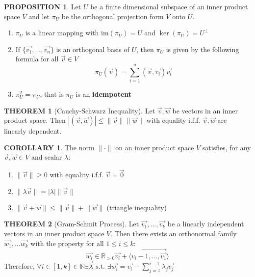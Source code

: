 \documentclass[12pt]{article}
\theoremstyle{definition}
\newtheorem{theorem}{THEOREM}[subsection]
\newcommand{\norm}[1]{\lVert #1 \rVert}
\newcommand{\image}{\text{im}}
\newtheorem{prop}{PROPOSITION}[subsection]
\newtheorem{corollary}{COROLLARY}[subsection]
\begin{document}
\begin{prop}
    Let $U$ be a finite dimensional subspace of an inner product space $V$ and let $\pi_U$ be the orthogonal projection form $V$ onto $U$.
    \begin{enumerate}
        \item $\pi_U$ is a linear mapping with $\image(\pi_U) = U$ and $\ker(\pi_U) = U^\perp$
        \item If $\{\vec{v_1},..., \vec{v_n}\}$ is an orthogonal basis of $U$, then $\pi_U$ is given by the following formula for all $\vec{v} \in V$ $$\pi_U(\vec{v}) = \sum_{i=1}^n(\vec{v},\vec{v_i})\vec{v_i}$$
        \item $\pi_U^2 = \pi_U$, that is $\pi_U$ is an \textbf{idempotent}
    \end{enumerate}
\end{prop}

\begin{theorem}[Cauchy-Schwarz Inequality]
    Let $\vec{v}, \vec{w}$ be vectors in an inner product space. Then $|(\vec{v}, \vec{w})| \leq \norm{\vec{v}}\norm{\vec{w}}$ with equality i.f.f. $\vec{v}, \vec{w}$ are linearly dependent.
\end{theorem}

\begin{corollary}
    The norm $\norm{\cdot}$ on an inner product space $V$ satisfies, for any $\vec{v}, \vec{w}\in V$ and scalar $\lambda$:
    \begin{enumerate}
        \item $\norm{\vec{v}} \geq 0$ with equality i.f.f. $\vec{v} = \vec{0}$
        \item $\norm{\lambda\vec{v}} = |\lambda|\norm{\vec{v}}$
        \item $\norm{\vec{v}+ \vec{w}} \leq \norm{\vec{v}} + \norm{\vec{w}}$ (triangle inequality)
    \end{enumerate}
\end{corollary}

\begin{theorem}[Gram-Schmit Process]
    Let $\vec{v_1},..., \vec{v_k}$ be a linearly independent vectors in an inner product space $V$. Then there exists an orthonormal family $\vec{w_1},... \vec{w_k}$ with the property for all $1 \leq i \leq k$: $$\vec{w_i} \in \mathbb{R}_{>0}\vec{v_i}+ \langle\vec{v_i-1,...,\vec{v_1}}\rangle$$
    Therefore, $\forall i \in [1,k]\in \mathbb{N} \exists \vec{\lambda} \text{ s.t. } \exists \vec{w_i} = \vec{v_i} - \sum_{j=1}^{i-1}\lambda_j \vec{v_j}$
\end{theorem}
\end{document}
